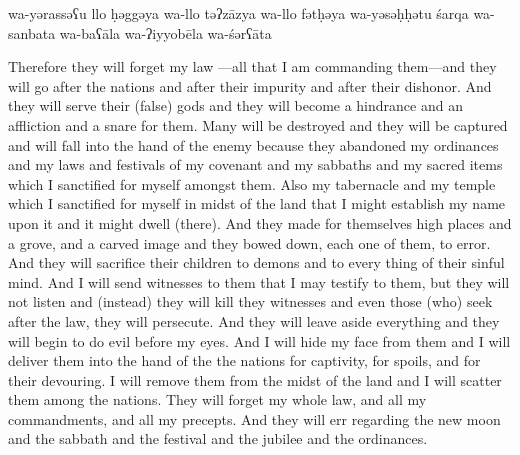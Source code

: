 \begin{transliteration}
    wa-yərassəʕu llo ḥəggəya
    wa-llo təʔzāzya wa-llo fətḥəya wa-yəsəḥḥətu śarqa wa-sanbata
    wa-baʕāla wa-ʔiyyobēla wa-śərʕāta
\end{transliteration}

\clearpage
\begin{translation}
    Therefore they will forget my law
    ---all that I am commanding them---and they will go after the nations and after
    their impurity and after their dishonor. And they will serve their (false) gods
    and they will become a hindrance and an affliction and a snare for them.
    Many will be destroyed and they will be captured and will fall into
    the hand of the enemy because they abandoned my ordinances and my laws and festivals of 
    my covenant and my sabbaths and my sacred items which I sanctified for myself amongst them.
    Also my tabernacle and my temple which I sanctified for myself in midst of
    the land that I might establish my name upon it and it might dwell (there).
    And they made
    for themselves high places and a grove, and a carved image and they bowed down, each one of them,
    to error. And they will sacrifice their children to demons and to every thing
    of their sinful mind.
    And I will send witnesses to them that
    I may testify to them, but they will not listen and (instead) they will kill they witnesses and even
    those (who) seek after the law, they will persecute. And they will leave aside everything and they will begin to do
    evil before my eyes.
    And I will hide my face
    from them and I will deliver them into the hand of the the nations for captivity,
    for spoils, and for their devouring. I will remove them from the midst of the land
    and I will scatter them among the nations.
    They will forget my whole law,
    and all my commandments, and all my precepts. And they will err regarding the new moon and the sabbath
    and the festival and the jubilee and the ordinances.
\end{translation}